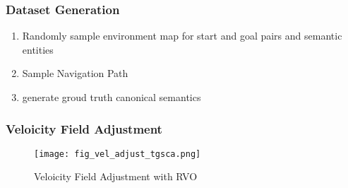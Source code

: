 \begin{frame}
    \frametitle{Dataset Generation}
    \begin{enumerate}
        \item Randomly sample environment map for start and goal pairs and semantic entities
        \item Sample Navigation Path 
        \item generate groud truth canonical semantics 
    \end{enumerate}
\end{frame}

\begin{frame}
    \frametitle{Veloicity Field Adjustment}
    \begin{figure}
        \texttt{[image: fig\_vel\_adjust\_tgsca.png]}
        \caption{Veloicity Field Adjustment with RVO\cite{vandenbergReciprocalVelocityObstacles2008}}
    \end{figure}
\end{frame}
